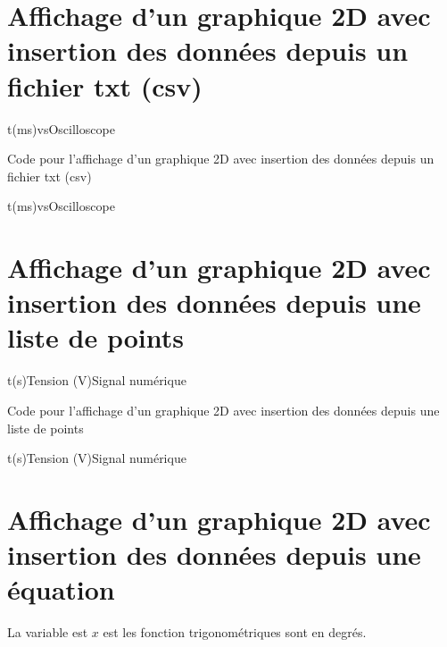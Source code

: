 {\section{Affichage d'un graphique 2D avec insertion des données depuis un fichier txt (csv)}

\begin{graphic}{0.8}{0.6}{0}{2.1}{-1.1}{1.1}{t(ms)}{vs}{Oscilloscope}
\end{graphic}

\begin{Latex}{Code pour l'affichage d'un graphique 2D avec insertion des données depuis un fichier txt (csv)}
\begin{graphic}{0.8}{0.6}{0}{2.1}{-1.1}{1.1}{t(ms)}{vs}{Oscilloscope}
\end{graphic}
\end{Latex}



\section{Affichage d'un graphique 2D avec insertion des données depuis une liste de points}

\begin{graphic}{0.8}{0.4}{0}{40}{-1}{6}{t(s)}{Tension (V)}{Signal numérique}
\end{graphic}

\begin{Latex}{Code pour l'affichage d'un graphique 2D avec insertion des données depuis une liste de points}
\begin{graphic}{0.8}{0.4}{0}{40}{-1}{6}{t(s)}{Tension (V)}{Signal numérique}
\end{graphic}
\end{Latex}


\section{Affichage d'un graphique 2D avec insertion des données depuis une équation}

La variable est $x$ est les fonction trigonométriques sont en degrés.\\

}
